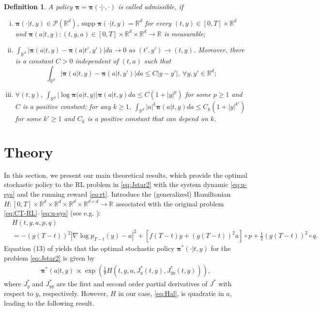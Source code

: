 \documentclass[11pt]{article}
\newtheorem{definition}{Definition}
\newcommand{\bpi}{\boldsymbol{\pi}}
\begin{document}
\begin{definition}\label{def:policy}
	A policy $\bpi = \bpi(\cdot| \cdot, \cdot)$ is called admissible, if
	\begin{enumerate}[(i)]
		\item $\bpi(\cdot| t,y) \in \mathcal{P} (\mathbb{R}^d)$,  $\text{supp}\;\bpi(\cdot| t,y) = \mathbb{R}^d$ for every $(t,y) \in [0, T] \times \mathbb{R}^d$ and $\boldsymbol{\pi} (a| t,y): (t,y,a) \in [0, T] \times   \mathbb{R}^d \times \mathbb{R}^d \rightarrow \mathbb{R}$ is measurable;
		
		\item $\int_{\mathbb{R}^d}\left|\bpi(a|t,y)-\bpi(a|t',y')\right|da\to 0$ as $(t',y')\to (t,y)$. Moreover, there is a constant $C>0$ independent of $(t,a)$ such that
		\begin{equation*}
			\int_{\mathbb{R}^d}\left|\bpi(a|t,y)-\bpi(a|t,y')\right|da\leq C |y-y'|,\ \forall y,y'\in\mathbb{R}^d;
		\end{equation*}
	
		\item $\forall (t,y)$, $\int_{\mathbb{R}^d} |\log \boldsymbol{\pi}(a|t,y)| \boldsymbol{\pi}(a |t,y) da \le C (1+ |y|^p)$ for some $p\geq 1$ and $C$ is a positive constant; for any $k\geq 1$, $\int_{\mathbb{R}^d} |a|^k\bpi(a|t,y) da \le C_k (1+ |y|^{k'})$  for some $k'\geq 1$ and $C_k$ is a positive constant that can depend on $k$.
	

	\end{enumerate}
\end{definition}



\section{Theory}\label{sec:theory}
In this section, we present our main theoretical results, which provide the optimal stochastic policy to the RL problem in \eqref{eq:Jstar2} with
the system dynamic \eqref{eq:u-sys} and the running reward \eqref{eq:rt}.  Introduce the (generalized) Hamiltonian $H: [0, T] \times \mathbb{R}^d \times \mathbb{R}^d \times \mathbb{R}^d  \times \mathbb{R}^{d \times d} \rightarrow \mathbb{R}$ associated with the original problem  \eqref{eq:CT-RL}--\eqref{eq:u-sys} (see e.g. \citealp{yong2012stochastic}):
\begin{align}\label{eq:Hal}
&H(t, y, a, p,q) \nonumber \\
&=   -(g(T-t))^{2}  | \nabla\log p_{T-t}(y) - a|^2  +  [f(T-t) y +(g(T-t))^{2} a ] \circ p + \frac{1}{2}(g(T-t))^{2} \circ  q.
\end{align}
Equation (13) of \cite{jia2023q} yields that the optimal stochastic policy $\bpi^* (\cdot| t, y)$ for the problem \eqref{eq:Jstar2} is given by
\begin{align*} %
	\boldsymbol{\pi}^*(a| t, y) \propto \exp \left(\frac{1}{\theta} H(t,y, a, J_y^*(t, y), J_{yy}^*(t, y))  \right),
\end{align*}
where $J_y^*$ and $J_{yy}^*$ are the first and second order partial derivatives of $J^*$ with respect to $y$, respectively.
However, $H$ in our case, \eqref{eq:Hal}, is quadratic in $a$, leading to the following result.
\end{document}
